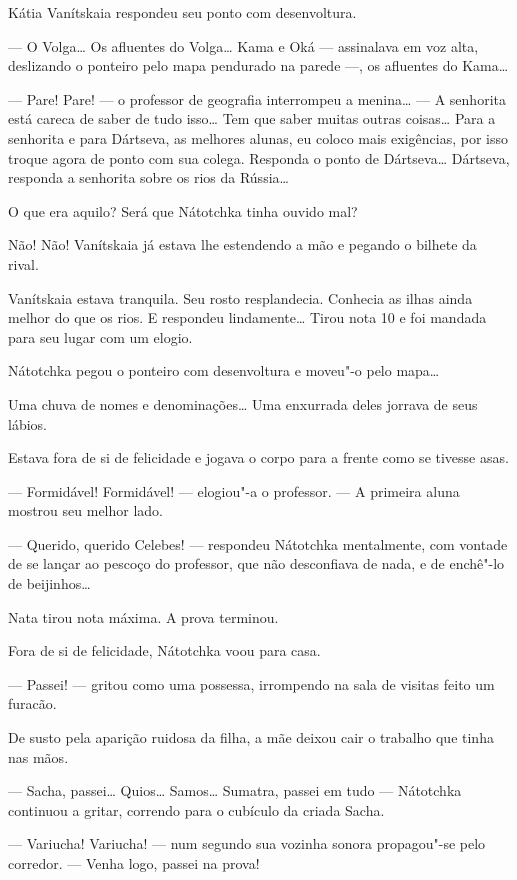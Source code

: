 Kátia Vanítskaia respondeu seu ponto com desenvoltura.

--- O Volga\ldots{} Os afluentes do Volga\ldots{} Kama e Oká --- assinalava em voz
alta, deslizando o ponteiro pelo mapa pendurado na parede ---, os
afluentes do Kama\ldots{}

--- Pare! Pare! --- o professor de geografia interrompeu a menina\ldots{} ---
A senhorita está careca de saber de tudo isso\ldots{} Tem que saber muitas
outras coisas\ldots{} Para a senhorita e para Dártseva, as melhores alunas,
eu coloco mais exigências, por isso troque agora de ponto com sua
colega. Responda o ponto de Dártseva\ldots{} Dártseva, responda a senhorita
sobre os rios da Rússia\ldots{}

O que era aquilo? Será que Nátotchka tinha ouvido mal?

Não! Não! Vanítskaia já estava lhe estendendo a mão e pegando o bilhete
da rival.

Vanítskaia estava tranquila. Seu rosto resplandecia. Conhecia as ilhas
ainda melhor do que os rios. E respondeu lindamente\ldots{} Tirou nota 10 e
foi mandada para seu lugar com um elogio.

Nátotchka pegou o ponteiro com desenvoltura e moveu"-o pelo mapa\ldots{}

Uma chuva de nomes e denominações\ldots{} Uma enxurrada deles jorrava de seus
lábios.

Estava fora de si de felicidade e jogava o corpo para a frente como se
tivesse asas.

--- Formidável! Formidável! --- elogiou"-a o professor. --- A primeira
aluna mostrou seu melhor lado.

--- Querido, querido Celebes! --- respondeu Nátotchka mentalmente, com
vontade de se lançar ao pescoço do professor, que não desconfiava de
nada, e de enchê"-lo de beijinhos\ldots{}

Nata tirou nota máxima. A prova terminou.

Fora de si de felicidade, Nátotchka voou para casa.

--- Passei! --- gritou como uma possessa, irrompendo na sala de visitas
feito um furacão.

De susto pela aparição ruidosa da filha, a mãe deixou cair o trabalho
que tinha nas mãos.

--- Sacha, passei\ldots{} Quios\ldots{} Samos\ldots{} Sumatra, passei em tudo ---
Nátotchka continuou a gritar, correndo para o cubículo da criada Sacha.

--- Variucha! Variucha! --- num segundo sua vozinha sonora propagou"-se
pelo corredor. --- Venha logo, passei na prova!

